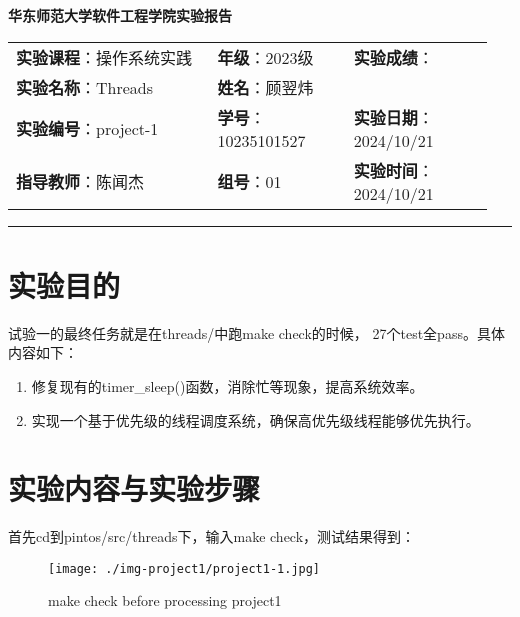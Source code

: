 \documentclass{article}
\begin{document}
	\begin{center}
		{\Large{\textbf{\heiti 华东师范大学软件工程学院实验报告}}}
		\begin{table}[htb]
			\flushleft
			\begin{tabular}{p{0.4\linewidth}p{0.27\linewidth}p{0.28\linewidth}}\\
				\textbf{实验课程}：操作系统实践  & \textbf{年级}：2023级       & \textbf{实验成绩}：  \\
				\textbf{实验名称}：Threads & \textbf{姓名}：顾翌炜         &                 \\
				\textbf{实验编号}：project-1     & \textbf{学号}：10235101527 & \textbf{实验日期}：2024/10/21  \\
				\textbf{指导教师}：陈闻杰     & \textbf{组号}：01            & \textbf{实验时间}：2024/10/21  \\ 
			\end{tabular}
		\end{table}
	\end{center}
	\rule{\textwidth}{2pt}
	
	\section{实验目的}
	
	试验一的最终任务就是在threads/中跑make check的时候， 27个test全pass。具体内容如下：
	\begin{enumerate}[noitemsep, label={{\arabic*})}]
		\item 修复现有的timer\_sleep()函数，消除忙等现象，提高系统效率。
		\item 实现一个基于优先级的线程调度系统，确保高优先级线程能够优先执行。
	\end{enumerate}
	\normalsize
	
	\section{实验内容与实验步骤}
	
	首先cd到pintos/src/threads下，输入make check，测试结果得到：
	
    \begin{figure}[htbp]
    	\centering
    	\texttt{[image: ./img-project1/project1-1.jpg]}
    	\caption{make check before processing project1}
    	\label{fig:graph1}
    \end{figure}
    
\end{document}
